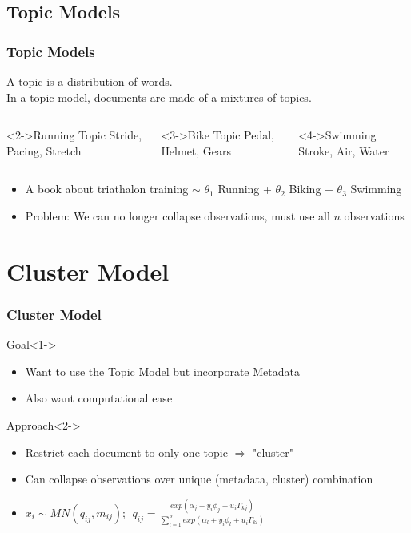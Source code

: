 \documentclass{beamer}
\begin{document}
\subsection{Topic Models}
\begin{frame}
 \frametitle{Topic Models}
A topic is a distribution of words. \\
In a topic model, documents are made of a mixtures of topics. 

\begin{columns}
\begin{block}<2->{Running Topic}
Stride, Pacing, Stretch
\end{block}
\begin{block}<3->{Bike Topic}
Pedal, Helmet, Gears
\end{block}
\begin{block}<4->{Swimming}
Stroke, Air, Water
\end{block}
\end{columns}
\begin{itemize}
\item<5-> A book about triathalon training $\sim$ $\theta_1$ Running + $\theta_2$ Biking + $\theta_3$ Swimming
\item<6-> Problem: We can no longer collapse observations, must use all $n$ observations
\end{itemize}
\end{frame}



\section{Cluster Model}
\begin{frame}
 \frametitle{Cluster Model}
\begin{block}{Goal}<1->
\begin{itemize}
\item Want to use the Topic Model but incorporate Metadata
\item Also want computational ease
\end{itemize}
\end{block}

\begin{block}{Approach}<2->
\begin{itemize}
\item Restrict each document to only one topic $\Rightarrow$ "cluster"
\item Can collapse observations over unique (metadata, cluster) combination
\item $ x_{i} \sim MN(q_{ij},m_{ij})    ; ~~  q_{ij} = \frac{exp(\alpha_j + y_i \phi_j + u_i \Gamma_{kj})}{\sum_{l=1}^{p}{exp(\alpha_l+ y_i \phi_l + u_i \Gamma_{kl})}} $
\end{itemize}
\end{block}
\end{frame}
\end{document}

